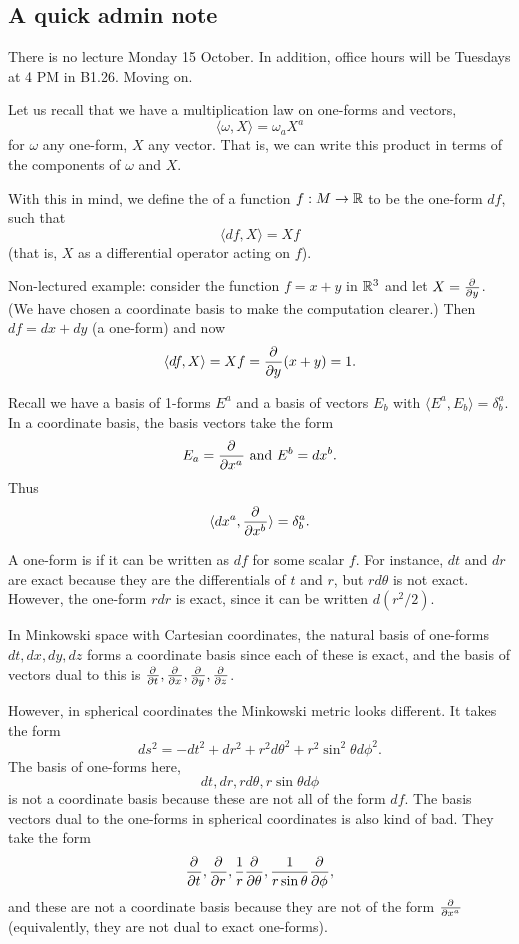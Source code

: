 \subsection*{A quick admin note} There is no lecture Monday 15 October. In addition, office hours will be Tuesdays at 4 PM in B1.26. Moving on.

Let us recall that we have a multiplication law on one-forms and vectors, 
$$\langle \omega, X\rangle = \omega_a X^a$$
for $\omega$ any one-form, $X$ any vector. That is, we can write this product in terms of the components of $\omega$ and $X$. 

\begin{defn}
With this in mind, we define the  of a function $f:M\to \RR$ to be the one-form $df$, such that
$$\langle df, X \rangle = Xf$$
(that is, $X$ as a differential operator acting on $f$).
\end{defn}
\begin{exm}
Non-lectured example: consider the function $f=x+y$ in $\RR^3$ and let $X= \P{}{y}$. (We have chosen a coordinate basis to make the computation clearer.) Then $df=dx+dy$ (a one-form) and now
$$\langle df, X \rangle = Xf = \P{}{y}(x+y)=1.$$
\end{exm}

Recall we have a basis of 1-forms $E^a$ and a basis of vectors $E_b$ with $\langle E^a, E_b \rangle = \delta^a_b$. In a coordinate basis, the basis vectors take the form
$$E_a = \P{}{x^a}\text{ and }E^b= dx^b.$$
Thus
$$\langle dx^a, \P{}{{x^b}}\rangle = \delta^a_b.$$
\begin{defn}
A one-form is  if it can be written as $df$ for some scalar $f$. For instance, $dt$ and $dr$ are exact because they are the differentials of $t$ and $r$, but $rd\theta$ is not exact. However, the one-form $r dr$ is exact, since it can be written $d(r^2 /2).$
\end{defn}
In Minkowski space with Cartesian coordinates, the natural basis of one-forms $dt,dx,dy,dz$ forms a coordinate basis since each of these is exact, and the basis of vectors dual to this is $\P{}{t},\P{}{x},\P{}{y},\P{}{z}$. 

However, in spherical coordinates the Minkowski metric looks different. It takes the form
$$ds^2=-dt^2 +dr^2+r^2d\theta^2 +r^2 \sin^2\theta d\phi^2.$$
The basis of one-forms here, 
$$dt, dr, rd\theta, r\sin\theta d\phi$$
is not a coordinate basis because these are not all of the form $df$.
The basis vectors dual to the one-forms in spherical coordinates is also kind of bad. They take the form 
$$\P{}{t},\P{}{r},\frac{1}{r}\P{}{\theta},\frac{1}{r\sin\theta}\P{}{\phi},$$ and these are not a coordinate basis because they are not of the form $\P{}{{x^a}}$ (equivalently, they are not dual to exact one-forms).

